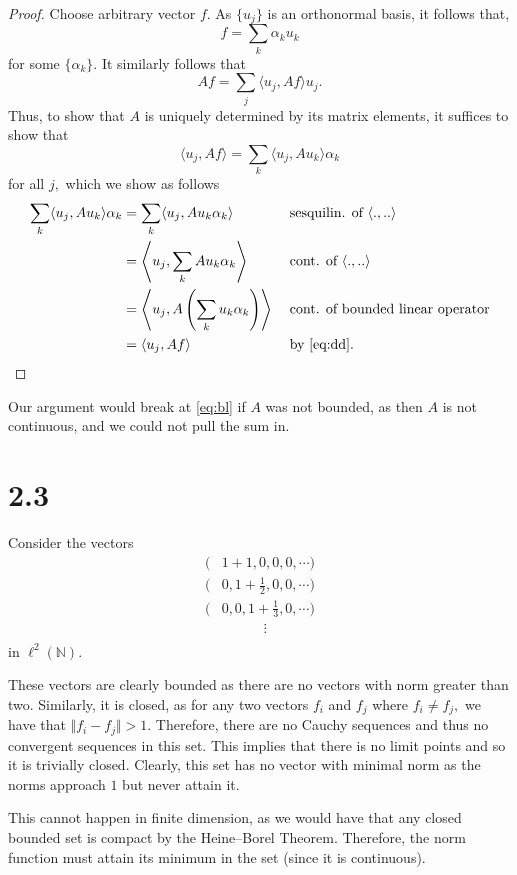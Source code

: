\documentclass[10pt]{article}
\begin{document}
\begin{proof}
    Choose arbitrary vector $f.$ As $\{u_j\}$ is an orthonormal basis, it follows that,
    \begin{equation} \label{eq:dd}
        f = \sum_k \alpha_k u_k
    \end{equation}
    for some $\{\alpha_k\}.$ It similarly follows that
    \[Af = \sum_j \langle u_j, Af\rangle u_j.\]
    Thus, to show that $A$ is uniquely determined by its matrix elements, it suffices to show that
    \[\langle u_j, Af\rangle =\sum_{k} \langle u_j, Au_k\rangle \alpha_k\]
    for all $j,$ which we show as follows
    \begin{alignat}{2}
        \sum_{k} \langle u_j, Au_k\rangle \alpha_k &= \sum_{k} \langle u_j, Au_k\alpha_k\rangle &&\text{sesquilin. of $\langle .,..\rangle$}\nonumber\\
        &= \left\langle u_j, \sum_{k} Au_k\alpha_k\right\rangle &&\text{cont. of $\langle .,..\rangle$}\nonumber\\
        &= \left\langle u_j, A \left (\sum_{k} u_k\alpha_k \right)\right\rangle\; &&\text{cont. of bounded linear operator}\label{eq:bl}\\
        &= \langle u_j, Af\rangle &&\text{by \eqref{eq:dd}}\nonumber.
    \end{alignat}
\end{proof}

\noindent
Our argument would break at \eqref{eq:bl} if $A$ was not bounded, as then $A$ is not continuous, and we could not pull the sum in.

\section*{2.3}
Consider the vectors 
\begin{align*}
     (&1+1,0,0,0,\cdots)\\
     (&0, 1 + \frac{1}{2},0,0,\cdots)\\
     (&0, 0,1 + \frac{1}{3},0,\cdots)\\
      &\quad\quad\quad\vdots\\
\end{align*}
in $\ell^2(\mathbb{N}).$

These vectors are clearly bounded as there are no vectors with norm greater than two. Similarly, it is closed, as for any two vectors $f_i$ and $f_j$ where $f_i \neq f_j,$ we have that
$\Vert f_i-f_j\Vert > 1.$
Therefore, there are no Cauchy sequences and thus no convergent sequences in this set. This implies that there is no limit points and so it is trivially closed. Clearly, this set has no vector with minimal norm as the norms approach $1$ but never attain it.

This cannot happen in finite dimension, as we would have that any closed bounded set is compact by the Heine--Borel Theorem. Therefore, the norm function must attain its minimum in the set (since it is continuous).
\end{document}
